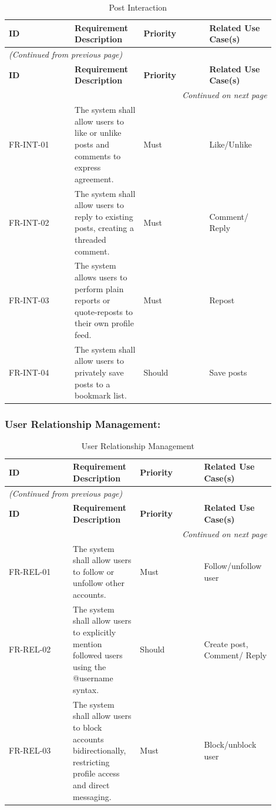 \begin{longtable}{|p{0.225\linewidth}|p{0.225\linewidth}|p{0.225\linewidth}|p{0.225\linewidth}|}
\caption{Post Interaction} \label{tab:8} \\
\hline
\textbf{ID} & \textbf{Requirement Description} & \textbf{Priority} & \textbf{Related Use Case(s)} \\
\hline
\endfirsthead
\multicolumn{4}{l}{\textit{(Continued from previous page)}} \\
\hline
\textbf{ID} & \textbf{Requirement Description} & \textbf{Priority} & \textbf{Related Use Case(s)} \\
\hline
\endhead
\hline \multicolumn{4}{r}{\textit{Continued on next page}} \\
\endfoot
\hline
\endlastfoot
FR-INT-01 & The system shall allow users to like or unlike posts and comments to express agreement. & Must & Like/Unlike \\
\hline
FR-INT-02 & The system shall allow users to reply to existing posts, creating a threaded comment. & Must & Comment/ Reply \\
\hline
FR-INT-03 & The system allows users to perform plain reports or quote-reposts to their own profile feed. & Must & Repost \\
\hline
FR-INT-04 & The system shall allow users to privately save posts to a bookmark list. & Should & Save posts \\
\hline
\end{longtable}


\subsubsection{User Relationship Management:}

\begin{longtable}{|p{0.225\linewidth}|p{0.225\linewidth}|p{0.225\linewidth}|p{0.225\linewidth}|}
\caption{User Relationship Management} \label{tab:9} \\
\hline
\textbf{ID} & \textbf{Requirement Description} & \textbf{Priority} & \textbf{Related Use Case(s)} \\
\hline
\endfirsthead
\multicolumn{4}{l}{\textit{(Continued from previous page)}} \\
\hline
\textbf{ID} & \textbf{Requirement Description} & \textbf{Priority} & \textbf{Related Use Case(s)} \\
\hline
\endhead
\hline \multicolumn{4}{r}{\textit{Continued on next page}} \\
\endfoot
\hline
\endlastfoot
FR-REL-01 & The system shall allow users to follow or unfollow other accounts. & Must & Follow/unfollow user \\
\hline
FR-REL-02 & The system shall allow users to explicitly mention followed users using the @username syntax. & Should & Create post, Comment/ Reply \\
\hline
FR-REL-03 & The system shall allow users to block accounts bidirectionally, restricting profile access and direct messaging. & Must & Block/unblock user \\
\hline
\end{longtable}


